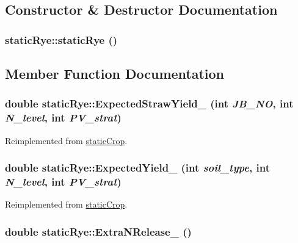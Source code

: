 \subsection{Constructor \& Destructor Documentation}
\hypertarget{classstatic_rye_ac213bcfc28e5c41044f1f8c1c0bcbe71}{
\subsubsection[{staticRye}]{\setlength{\rightskip}{0pt plus 5cm}staticRye::staticRye ()}}
\label{classstatic_rye_ac213bcfc28e5c41044f1f8c1c0bcbe71}


\subsection{Member Function Documentation}
\hypertarget{classstatic_rye_a7e9c9e6226d2311ae3b621b79753bdf9}{
\subsubsection[{ExpectedStrawYield\_\-}]{\setlength{\rightskip}{0pt plus 5cm}double staticRye::ExpectedStrawYield\_\- (int {\em JB\_\-NO}, \/  int {\em N\_\-level}, \/  int {\em PV\_\-strat})}}
\label{classstatic_rye_a7e9c9e6226d2311ae3b621b79753bdf9}


Reimplemented from \hyperlink{classstatic_crop_a884a8335aebc5effa3fecdb75af3ca85}{staticCrop}.\hypertarget{classstatic_rye_a6c6bedff00773f73edc12bba9702b27a}{
\subsubsection[{ExpectedYield\_\-}]{\setlength{\rightskip}{0pt plus 5cm}double staticRye::ExpectedYield\_\- (int {\em soil\_\-type}, \/  int {\em N\_\-level}, \/  int {\em PV\_\-strat})}}
\label{classstatic_rye_a6c6bedff00773f73edc12bba9702b27a}


Reimplemented from \hyperlink{classstatic_crop_ab7b9a8ecb31b10c4dcf44f13000e2f8c}{staticCrop}.\hypertarget{classstatic_rye_a62343c8b7153985ed21866d7d64e5b40}{
\subsubsection[{ExtraNRelease\_\-}]{\setlength{\rightskip}{0pt plus 5cm}double staticRye::ExtraNRelease\_\- ()}}
\label{classstatic_rye_a62343c8b7153985ed21866d7d64e5b40}


